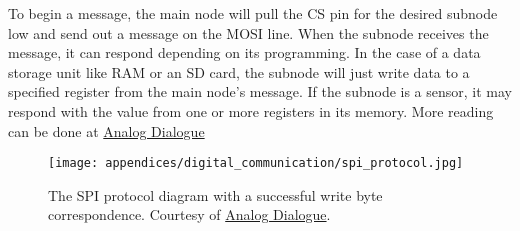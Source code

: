 To begin a message, the main node will pull the CS pin for the desired subnode low and send out a message on the MOSI line.
When the subnode receives the message, it can respond depending on its programming.
In the case of a data storage unit like RAM or an SD card, the subnode will just write data to a specified register from the main node's message.
If the subnode is a sensor, it may respond with the value from one or more registers in its memory.
More reading can be done at \href{https://www.analog.com/en/analog-dialogue/articles/introduction-to-spi-interface.html}{Analog Dialogue}

\begin{figure}[h!]
    \caption[SPI protocol diagram]{The SPI protocol diagram with a successful write byte correspondence. 
    Courtesy of \href{https://www.analog.com/en/analog-dialogue/articles/introduction-to-spi-interface.html}{Analog Dialogue}.}
    \centering
    \texttt{[image: appendices/digital\_communication/spi\_protocol.jpg]}
\end{figure}
